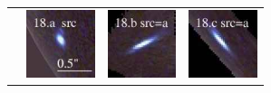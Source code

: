 \documentclass[useAMS,usenatbib]{mn2e}
\begin{document}
\begin{table}
\begin{tabular}{cccc}
    & \multicolumn{1}{m{1.7cm}}{\includegraphics[height=2.00cm,clip]{figs/enfw_img/rgb.src_18_a.ps}}
    & \multicolumn{1}{m{1.7cm}}{\includegraphics[height=2.00cm,clip]{figs/enfw_img/rgb.pre_18_b_a_tri.ps}}
    & \multicolumn{1}{m{1.7cm}}{\includegraphics[height=2.00cm,clip]{figs/enfw_img/rgb.pre_18_c_a_tri.ps}} \\
  \end{tabular}

\end{table}

\clearpage
\end{document}

